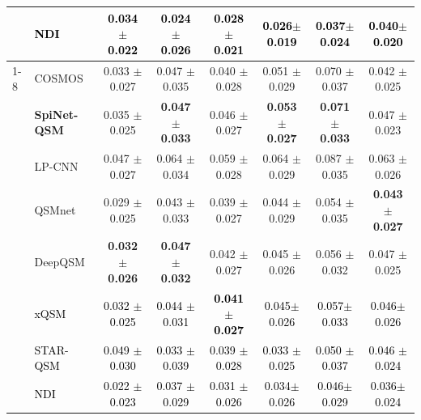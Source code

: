 \documentclass[sn-vancouver,Numbered]{sn-jnl}%
\begin{document}
\begin{table}[htbp]
{\begin{tabular}{llcccccc}
& \textcolor{black}{NDI}               
&\textcolor{black}{0.034 $\pm$ 0.022}
&\textcolor{black}{0.024 $\pm$ 0.026}
&\textcolor{black}{0.028 $\pm$ 0.021}
&\textcolor{black}{0.026$\pm$ 0.019}
&\textcolor{black}{0.037$\pm$ 0.024}
&\textcolor{black}{0.040$\pm$ 0.020}\\ 

\cmidrule{1-8}


\multirow{5}{*}{PUT}        
&COSMOS  
&0.033 $\pm$ 0.027
&0.047 $\pm$ 0.035
&0.040 $\pm$ 0.028
&0.051 $\pm$ 0.029
&0.070 $\pm$ 0.037
&0.042 $\pm$ 0.025 \\ 

&\textbf{SpiNet-QSM}   
&0.035 $\pm$ 0.025
&\textbf{0.047 $\pm$ 0.033}
& 0.046 $\pm$ 0.027
&\textbf{0.053 $\pm$ 0.027}
&\textbf{0.071 $\pm$ 0.033}
&0.047 $\pm$ 0.023 \\ 

&LP-CNN                
&0.047 $\pm$ 0.027
&0.064 $\pm$ 0.034
&0.059 $\pm$ 0.028
&0.064 $\pm$ 0.029
&0.087 $\pm$ 0.035
&0.063 $\pm$ 0.026\\ 

& QSMnet                
&0.029 $\pm$ 0.025
&0.043 $\pm$ 0.033
&0.039 $\pm$ 0.027
&0.044 $\pm$ 0.029
&0.054 $\pm$ 0.035
&\textbf{0.043 $\pm$ 0.027}\\ 

& DeepQSM               
&\textbf{0.032 $\pm$ 0.026}
&\textbf{0.047 $\pm$ 0.032}
&0.042 $\pm$ 0.027
&0.045 $\pm$ 0.026
&0.056 $\pm$ 0.032
&0.047 $\pm$ 0.025 \\ 

&\textcolor{black}{xQSM}               
&\textcolor{black}{0.032 $\pm$ 0.025}
&\textcolor{black}{0.044 $\pm$ 0.031}
&\textcolor{black}{\textbf{0.041 $\pm$ 0.027}}
&\textcolor{black}{0.045$\pm$ 0.026}
&\textcolor{black}{0.057$\pm$ 0.033}
&\textcolor{black}{0.046$\pm$ 0.026}\\ 

&\textcolor{black}{STAR-QSM}               
&\textcolor{black}{0.049 $\pm$ 0.030}
&\textcolor{black}{0.033 $\pm$ 0.039}
&\textcolor{black}{0.039 $\pm$ 0.028}
&\textcolor{black}{0.033 $\pm$ 0.025}
&\textcolor{black}{0.050 $\pm$ 0.037}
&\textcolor{black}{0.046 $\pm$ 0.024} \\ 



&\textcolor{black}{NDI}               
&\textcolor{black}{0.022 $\pm$ 0.023}
&\textcolor{black}{0.037 $\pm$ 0.029}
&\textcolor{black}{0.031 $\pm$ 0.026}
&\textcolor{black}{0.034$\pm$ 0.026}
&\textcolor{black}{0.046$\pm$ 0.029}
&\textcolor{black}{0.036$\pm$ 0.024}\\









\end{tabular}}
\end{table}
\end{document}
